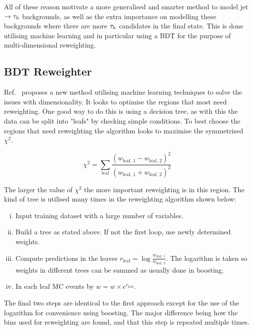 All of these reason motivate a more generalised and smarter method to model jet $\rightarrow\tau_{h}$ backgrounds, as well as the extra importance on modelling these backgrounds where there are more $\tau_{h}$ candidates in the final state.
This is done utilising machine learning and in particular using a BDT for the purpose of multi-dimensional reweighting. \\ 

\subsection{BDT Reweighter}

Ref.~\cite{Rogozhnikov:2016bdp} proposes a new method utilising machine learning techniques to solve the issues with dimensionality. 
It looks to optimise the regions that most need reweighting. 
One good way to do this is using a decision tree, as with this the data can be split into "leafs" by checking simple conditions.
To best choose the regions that need reweighting the algorithm looks to maximise the symmetrised $\chi^2$.

\begin{equation}
\chi^2 = \sum_{\text{leaf}} \frac{(w_{\text{leaf, 1}}-w_{\text{leaf, 2}})^2}{(w_{\text{leaf, 1}}+w_{\text{leaf, 2}})^2}
\end{equation}

The larger the value of $\chi^2$ the more important reweighting is in this region. 
The kind of tree is utilised many times in the reweighting algorithm shown below:

\begin{enumerate}[i)]
\item Input training dataset with a large number of variables.
\item Build a tree as stated above. If not the first loop, use newly determined weights.
\item Compute predictions in the leaves $r_{\text{leaf}} = \log\frac{w_{\text{leaf, 1}}}{w_{\text{leaf, 2}}}$. The logarithm is taken so weights in different trees can be summed as usually done in boosting.
\item In each leaf MC events by $w = w \times e^{r_{\text{leaf}}}$.
\end{enumerate}

The final two steps are identical to the first approach except for the use of the logarithm for convenience using boosting. 
The major difference being how the bins used for reweighting are found, and that this step is repeated multiple times. \\

